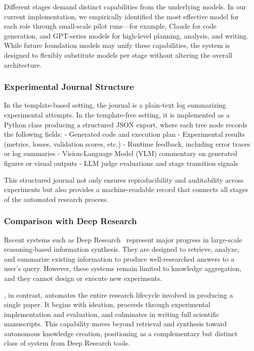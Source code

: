\begin{appendices}
Different stages demand distinct capabilities from the underlying models. In our current implementation, we empirically identified the most effective model for each role through small-scale pilot runs—for example, Claude for code generation, and GPT-series models for high-level planning, analysis, and writing. While future foundation models may unify these capabilities, the system is designed to flexibly substitute models per stage without altering the overall architecture.

\subsubsection{Experimental Journal Structure}

In the template-based setting, the journal is a plain-text log summarizing experimental attempts. In the template-free setting, it is implemented as a Python class producing a structured JSON export, where each tree node records the following fields:
- Generated code and execution plan
- Experimental results (metrics, losses, validation scores, etc.)
- Runtime feedback, including error traces or log summaries
- Vision-Language Model (VLM) commentary on generated figures or visual outputs
- LLM judge evaluations and stage transition signals

This structured journal not only ensures reproducibility and auditability across experiments but also provides a machine-readable record that connects all stages of the automated research process.

\subsubsection{Comparison with Deep Research}

Recent systems such as Deep Research~\cite{openai2025DeepResearch} represent major progress in large-scale reasoning-based information synthesis.
They are designed to retrieve, analyze, and summarize existing information to produce well-researched answers to a user's query.
However, these systems remain limited to knowledge aggregation, and they cannot design or execute new experiments.

\ouralgo, in contrast, automates the entire research lifecycle involved in producing a single paper.
It begins with ideation, proceeds through experimental implementation and evaluation, and culminates in writing full scientific manuscripts.
This capability moves beyond retrieval and synthesis toward autonomous knowledge creation, positioning \ouralgo as a complementary but distinct class of system from Deep Research tools.



\end{appendices}
